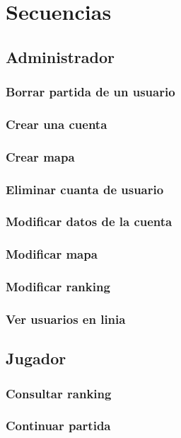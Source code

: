 \section{Secuencias}\label{sec:uc0}


\subsection{Administrador}\label{sec:uc0}
\subsubsection{Borrar partida de un usuario}
\subsubsection{Crear una cuenta}
\subsubsection{Crear mapa}
\subsubsection{Eliminar cuanta de usuario}
\subsubsection{Modificar datos de la cuenta}
\subsubsection{Modificar mapa}
\subsubsection{Modificar ranking}
\subsubsection{Ver usuarios en linia}



\subsection{Jugador}\label{sec:uc0}
\subsubsection{Consultar ranking}
\subsubsection{Continuar partida}
